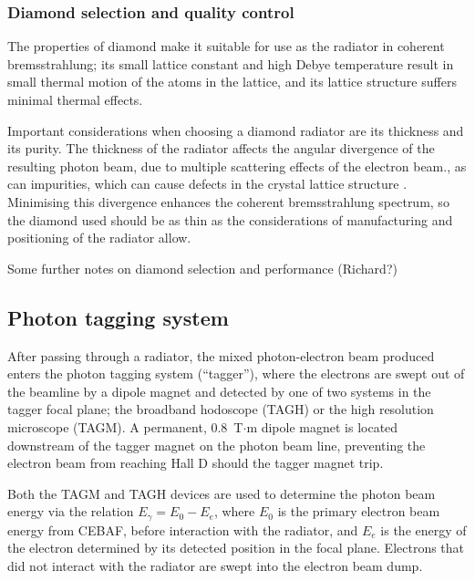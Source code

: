 \subsubsection{Diamond selection and quality control \label{sec:diamonds}}
The properties of diamond make it suitable for use as the radiator in coherent bremsstrahlung; its small lattice constant and high Debye temperature result in small thermal motion of the atoms in the lattice, and its lattice structure suffers minimal thermal effects.

Important considerations when choosing a diamond radiator are its thickness and its purity. The thickness of the radiator affects the angular divergence of the resulting photon beam, due to multiple scattering effects of the electron beam., as can impurities, which can cause defects in the crystal lattice structure \cite{YANG2010719,YANG2012}.
Minimising this divergence enhances the coherent bremsstrahlung spectrum, so the diamond used should be as thin as the considerations of manufacturing and positioning of the radiator allow.

{\color{red}Some further notes on diamond selection and performance (Richard?)}



\subsection{Photon tagging system \label{sec:tag}}
After passing through a radiator, the mixed photon-electron beam produced enters the photon tagging system (``tagger''), where the electrons are swept out of the beamline by a dipole magnet and detected by one of two systems in the tagger focal plane; the broadband hodoscope (TAGH) or the high resolution microscope (TAGM). %
A permanent, 0.8~T$\cdot$m dipole magnet is located
downstream of the tagger magnet on the photon beam line, preventing
the electron beam from reaching Hall D should the tagger magnet trip.

Both the TAGM and TAGH devices are used to determine the photon beam energy via the relation $E_{\gamma} = E_{0} - E_{e}$, where $E_{0}$ is the primary electron beam energy from CEBAF, before interaction with the radiator, and $E_{e}$ is the energy of the electron determined by its detected position in the focal plane.
Electrons that did not interact with the radiator are swept into the electron beam dump.


